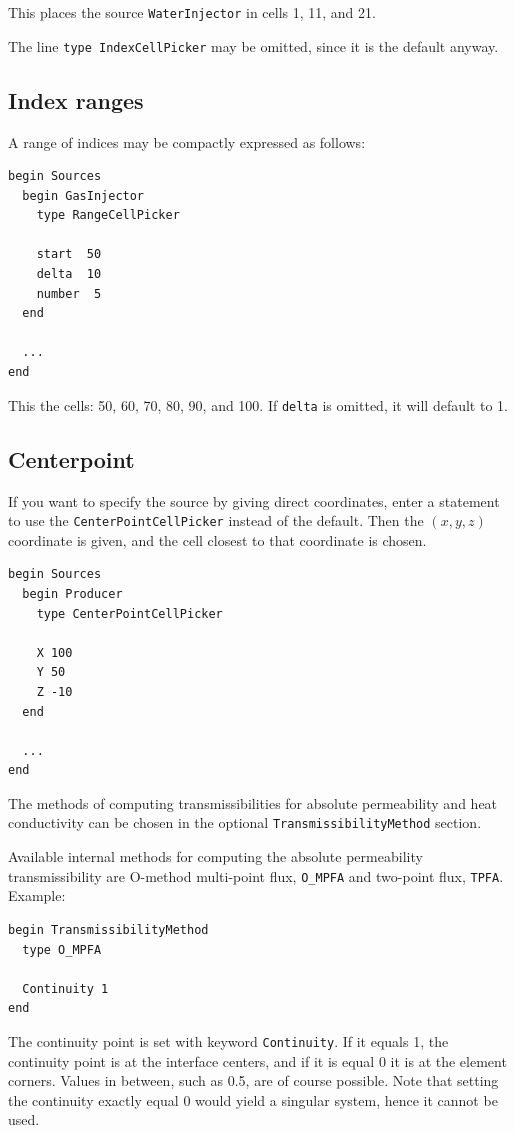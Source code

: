 This places the source \texttt{WaterInjector} in cells 1, 11, and 21.

The line \texttt{type IndexCellPicker} may be omitted, since it
is the default anyway.


\subsection{Index ranges}

A range of indices may be compactly expressed as follows:

\begin{verbatim}
begin Sources
  begin GasInjector
    type RangeCellPicker

    start  50
    delta  10
    number  5
  end

  ...
end
\end{verbatim}

This the cells: 50, 60, 70, 80, 90, and 100. If \texttt{delta} is
omitted, it will default to 1.


\subsection{Centerpoint}

If you want to specify the source by giving direct coordinates, enter
a statement to use the {\tt CenterPointCellPicker} instead of the
default. Then the $(x,y,z)$ coordinate is given, and the cell closest
to that coordinate is chosen.

\begin{verbatim}
begin Sources
  begin Producer
    type CenterPointCellPicker

    X 100
    Y 50
    Z -10
  end

  ...
end
\end{verbatim}


\label{sec:transmissibility}

The methods of computing transmissibilities for absolute permeability
and heat conductivity can be chosen in the optional
\texttt{TransmissibilityMethod} section.

Available internal methods for computing the absolute permeability
transmissibility are O-method multi-point flux, \texttt{O\_MPFA} and
two-point flux, \texttt{TPFA}. Example:
%
\begin{verbatim}
begin TransmissibilityMethod
  type O_MPFA

  Continuity 1
end
\end{verbatim}
%
The continuity point is set with keyword \texttt{Continuity}. If it
equals 1, the continuity point is at the interface centers, and if it
is equal 0 it is at the element corners. Values in between, such as
0.5, are of course possible. Note that setting the continuity exactly
equal 0 would yield a singular system, hence it cannot be used.

